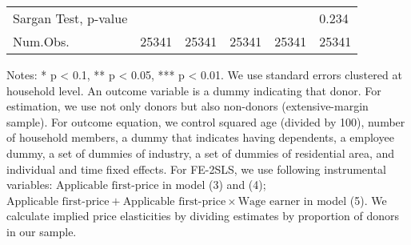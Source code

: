 \begin{table}
\begin{threeparttable}
\begin{tabular}[t]{l>{\centering\arraybackslash}p{6em}>{\centering\arraybackslash}p{6em}>{\centering\arraybackslash}p{6em}>{\centering\arraybackslash}p{6em}>{\centering\arraybackslash}p{6em}}
\hspace{1em}Sargan Test, p-value &  &  &  &  & \num{0.234}\\
Num.Obs. & \num{25341} & \num{25341} & \num{25341} & \num{25341} & \num{25341}\\
\bottomrule
\end{tabular}
\begin{tablenotes}
\item Notes: * p < 0.1, ** p < 0.05, *** p < 0.01. We use standard errors clustered at household level. An outcome variable is a dummy indicating that donor. For estimation, we use not only donors but also non-donors (extensive-margin sample). For outcome equation, we control squared age (divided by 100), number of household members, a dummy that indicates having dependents, a employee dummy, a set of dummies of industry, a set of dummies of residential area, and individual and time fixed effects. For FE-2SLS, we use following instrumental variables: $\text{Applicable first-price}$ in model (3) and (4); $\text{Applicable first-price} + \text{Applicable first-price} \times \text{Wage earner}$ in model (5). We calculate implied price elasticities by dividing estimates by proportion of donors in our sample.
\end{tablenotes}
\end{threeparttable}
\end{table}
